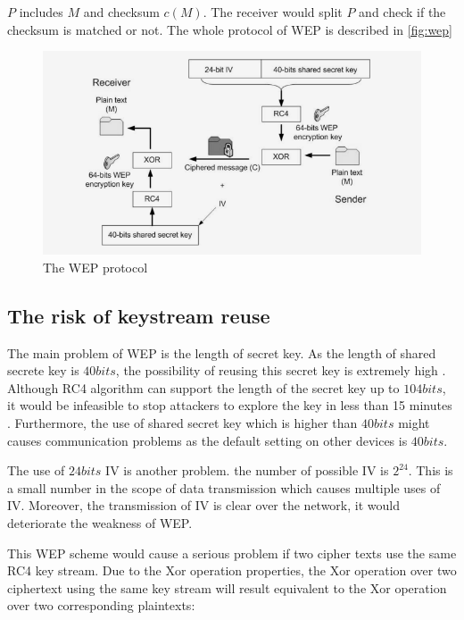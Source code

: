 	
$P$ includes $M$ and checksum $c(M)$. The receiver would split $P$ and check if the checksum is matched or not. The whole protocol of \ac{WEP} is described in \autoref{fig:wep}
\begin{figure}
	\includegraphics[scale=0.35]{images/wep.png}
	\caption{The WEP protocol \cite{al2006ieee}}
	\label{fig:wep}
\end{figure}

\subsection{The risk of keystream reuse}

The main problem of \ac{WEP} is the length of secret key. As the length of shared secrete key is $40bits$, the possibility of reusing this secret key is extremely high \cite{al2006ieee}. Although \ac{RC4} algorithm can support the length of the secret key up to $104bits$, it would be infeasible to stop attackers to explore the key in less than 15 minutes \cite{convery2003cisco}. Furthermore, the use of shared secret key which is higher than $40bits$ might causes communication problems as the default setting on other devices is $40bits$. 

The use of $24bits$ \ac{IV} is another problem. the number of possible \ac{IV} is $2^{24}$. This is a small number in the scope of data transmission which causes multiple uses of \ac{IV}. Moreover, the transmission of \ac{IV} is clear over the network, it would deteriorate the weakness of \ac{WEP}.

This \ac{WEP} scheme would cause a serious problem if two cipher texts use the same \ac{RC4} key stream. Due to the \ac{Xor} operation properties, the \ac{Xor} operation over two ciphertext using the same key stream will result equivalent to the \ac{Xor} operation over two corresponding plaintexts:

